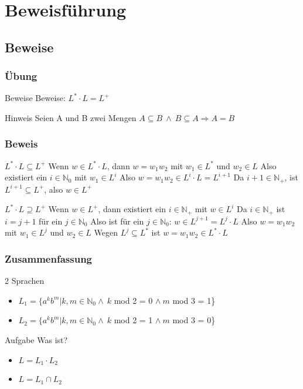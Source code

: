 \documentclass{beamer}
\begin{document}
\section{Beweisführung}
\subsection{Beweise}
\begin{frame}
\frametitle{Übung}
\begin{block}{Beweise}
Beweise: $L^{*} \cdot L = L^{+}$
\end{block}
\begin{block}{Hinweis}
Seien A und B zwei Mengen
\newline $A \subseteq B \ \land \ B \subseteq A \Rightarrow A = B$
\end{block}
\end{frame}
\begin{frame}
\frametitle{Beweis}
\begin{block}{$L^{*} \cdot L \subseteq L^{+}$}
Wenn $w \in L^{*} \cdot L$, dann $w = w_{1}w_{2}$ mit $w_{1} \in L^{*}$ und
$w_{2} \in L$ \newline
Also existiert ein $i \in \mathbb N_{0}$ mit $w_{1} \in L^{i}$ \newline
Also $w = w_{1}w_{2} \in L^{i} \cdot L = L^{i+1}$ \newline
Da $i+1 \in \mathbb N_{+}$, ist $L^{i+1} \subseteq L^{+}$, also $w \in L^{+}$
\end{block}
\begin{block}{$L^{*} \cdot L \supseteq L^{+}$}
Wenn $w \in L^{+}$, dann existiert ein $i \in \mathbb N_{+}$ mit $w \in L^{i}$
\newline Da $i \in \mathbb N_{+}$ ist $i = j + 1$ für ein $j \in \mathbb N_{0}$
\newline Also ist für ein $j \in \mathbb N_{0}$: $w \in L^{j+1} = L^{j} \cdot L$
\newline Also $w = w_{1}w_{2}$ mit $w_{1} \in L^{j}$ und $w_{2} \in L$ \newline
Wegen $L^{j} \subseteq L^{*}$ ist $w = w_{1}w_{2} \in L^{*} \cdot L$
\end{block}
\end{frame}
\begin{frame}
\frametitle{Zusammenfassung}
\begin{block}{2 Sprachen}
\begin{itemize}
\item $L_{1} = \{a^{k}b^{m}|k,m \in \mathbb N_{0} \land \ k$ mod 2 = 0 $\land
\ m$ mod 3 = 1\}
\item $L_{2} = \{a^{k}b^{m}|k,m \in \mathbb N_{0} \land \ k$ mod 2 = 1 $\land
\ m$ mod 3 = 0\}
\end{itemize}
\end{block}
\begin{block}{Aufgabe}
Was ist?
\begin{itemize}
\item $ L = L_1 \cdot L_2$
\item $ L = L_1 \cap L_2$
\end{itemize}
\end{block}
\end{frame}
\end{document}
